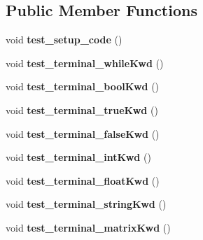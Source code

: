 \subsection*{Public Member Functions}
\begin{DoxyCompactItemize}
\item 
\hypertarget{classScannerTestSuite_ade832b9b4b3bd92980d43c4050cebd2c}{void {\bfseries test\-\_\-setup\-\_\-code} ()}\label{classScannerTestSuite_ade832b9b4b3bd92980d43c4050cebd2c}

\item 
\hypertarget{classScannerTestSuite_a9a67154a3d7fd4888e5c4761065a460a}{void {\bfseries test\-\_\-terminal\-\_\-while\-Kwd} ()}\label{classScannerTestSuite_a9a67154a3d7fd4888e5c4761065a460a}

\item 
\hypertarget{classScannerTestSuite_a919ec02392d67e0932affc229b1e72c8}{void {\bfseries test\-\_\-terminal\-\_\-bool\-Kwd} ()}\label{classScannerTestSuite_a919ec02392d67e0932affc229b1e72c8}

\item 
\hypertarget{classScannerTestSuite_a88607da81181c529df9b9edf246dfff6}{void {\bfseries test\-\_\-terminal\-\_\-true\-Kwd} ()}\label{classScannerTestSuite_a88607da81181c529df9b9edf246dfff6}

\item 
\hypertarget{classScannerTestSuite_a6a4395c74f53b0ff0024d6a81999d1b4}{void {\bfseries test\-\_\-terminal\-\_\-false\-Kwd} ()}\label{classScannerTestSuite_a6a4395c74f53b0ff0024d6a81999d1b4}

\item 
\hypertarget{classScannerTestSuite_af42f8338bfe7b397ea39f565157f64cc}{void {\bfseries test\-\_\-terminal\-\_\-int\-Kwd} ()}\label{classScannerTestSuite_af42f8338bfe7b397ea39f565157f64cc}

\item 
\hypertarget{classScannerTestSuite_a5c55d99dbc84996abd740fbabb36314b}{void {\bfseries test\-\_\-terminal\-\_\-float\-Kwd} ()}\label{classScannerTestSuite_a5c55d99dbc84996abd740fbabb36314b}

\item 
\hypertarget{classScannerTestSuite_a141d32b206981d44cbdbf478a20be967}{void {\bfseries test\-\_\-terminal\-\_\-string\-Kwd} ()}\label{classScannerTestSuite_a141d32b206981d44cbdbf478a20be967}

\item 
\hypertarget{classScannerTestSuite_ae2d7798c81ef50444efe99f5c7a89148}{void {\bfseries test\-\_\-terminal\-\_\-matrix\-Kwd} ()}\label{classScannerTestSuite_ae2d7798c81ef50444efe99f5c7a89148}


\end{DoxyCompactItemize}
